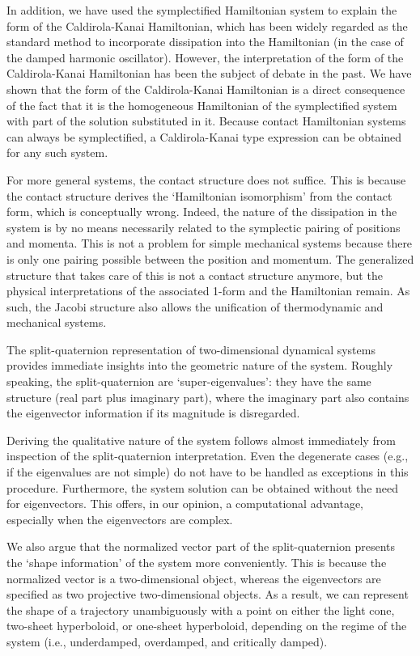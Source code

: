 In addition, we have used the symplectified Hamiltonian system to explain the form of the Caldirola-Kanai Hamiltonian, which has been widely regarded as the standard method to incorporate dissipation into the Hamiltonian (in the case of the damped harmonic oscillator). However, the interpretation of the form of the Caldirola-Kanai Hamiltonian has been the subject of debate in the past. We have shown that the form of the Caldirola-Kanai Hamiltonian is a direct consequence of the fact that it is the homogeneous Hamiltonian of the symplectified system with part of the solution substituted in it.
Because contact Hamiltonian systems can always be symplectified, a Caldirola-Kanai type expression can be obtained for any such system.

For more general systems, the contact structure does not suffice. This is because the contact structure derives the `Hamiltonian isomorphism' from the contact form, which is conceptually wrong. Indeed, the nature of the dissipation in the system is by no means necessarily related to the symplectic pairing of positions and momenta. This is not a problem for simple mechanical systems because there is only one pairing possible between the position and momentum. The generalized structure that takes care of this is not a contact structure anymore, but the physical interpretations of the associated 1-form and the Hamiltonian remain. As such, the Jacobi structure also allows the unification of thermodynamic and mechanical systems.

The split-quaternion representation of two-dimensional dynamical systems provides immediate insights into the geometric nature of the system. Roughly speaking, the split-quaternion are `super-eigenvalues': they have the same structure (real part plus imaginary part), where the imaginary part also contains the eigenvector information if its magnitude is disregarded.

Deriving the qualitative nature of the system follows almost immediately from inspection of the split-quaternion interpretation. Even the degenerate cases (e.g., if the eigenvalues are not simple) do not have to be handled as exceptions in this procedure. 
Furthermore, the system solution can be obtained without the need for eigenvectors. This offers, in our opinion, a computational advantage, especially when the eigenvectors are complex.

We also argue that the normalized vector part of the split-quaternion presents the `shape information' of the system more conveniently. This is because the normalized vector is a two-dimensional object, whereas the eigenvectors are specified as two projective two-dimensional objects. As a result, we can represent the shape of a trajectory unambiguously with a point on either the light cone, two-sheet hyperboloid, or one-sheet hyperboloid, depending on the regime of the system (i.e., underdamped, overdamped, and critically damped).

